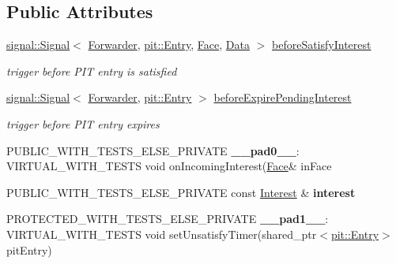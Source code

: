 \subsection*{Public Attributes}
\begin{DoxyCompactItemize}
\item 
\hyperlink{classndn_1_1util_1_1signal_1_1Signal}{signal\+::\+Signal}$<$ \hyperlink{classnfd_1_1Forwarder}{Forwarder}, \hyperlink{classnfd_1_1pit_1_1Entry}{pit\+::\+Entry}, \hyperlink{classnfd_1_1Face}{Face}, \hyperlink{classndn_1_1Data}{Data} $>$ \hyperlink{classnfd_1_1Forwarder_a32566fb05aa466ad3882221453ee28db}{before\+Satisfy\+Interest}
\begin{DoxyCompactList}\small\item\em trigger before P\+IT entry is satisfied \end{DoxyCompactList}\item 
\hyperlink{classndn_1_1util_1_1signal_1_1Signal}{signal\+::\+Signal}$<$ \hyperlink{classnfd_1_1Forwarder}{Forwarder}, \hyperlink{classnfd_1_1pit_1_1Entry}{pit\+::\+Entry} $>$ \hyperlink{classnfd_1_1Forwarder_a7e2f5b00f3146356077d84cd107a1394}{before\+Expire\+Pending\+Interest}
\begin{DoxyCompactList}\small\item\em trigger before P\+IT entry expires \end{DoxyCompactList}\item 
P\+U\+B\+L\+I\+C\+\_\+\+W\+I\+T\+H\+\_\+\+T\+E\+S\+T\+S\+\_\+\+E\+L\+S\+E\+\_\+\+P\+R\+I\+V\+A\+TE {\bfseries \+\_\+\+\_\+pad0\+\_\+\+\_\+}\+: V\+I\+R\+T\+U\+A\+L\+\_\+\+W\+I\+T\+H\+\_\+\+T\+E\+S\+TS void on\+Incoming\+Interest(\hyperlink{classnfd_1_1Face}{Face}\& in\+Face\hypertarget{classnfd_1_1Forwarder_a04f42f27280373151a8ecd74983089bf}{}\label{classnfd_1_1Forwarder_a04f42f27280373151a8ecd74983089bf}

\item 
P\+U\+B\+L\+I\+C\+\_\+\+W\+I\+T\+H\+\_\+\+T\+E\+S\+T\+S\+\_\+\+E\+L\+S\+E\+\_\+\+P\+R\+I\+V\+A\+TE const \hyperlink{classndn_1_1Interest}{Interest} \& {\bfseries interest}\hypertarget{classnfd_1_1Forwarder_a41e18f4d8424fff0fcbf75307047c277}{}\label{classnfd_1_1Forwarder_a41e18f4d8424fff0fcbf75307047c277}

\item 
P\+R\+O\+T\+E\+C\+T\+E\+D\+\_\+\+W\+I\+T\+H\+\_\+\+T\+E\+S\+T\+S\+\_\+\+E\+L\+S\+E\+\_\+\+P\+R\+I\+V\+A\+TE {\bfseries \+\_\+\+\_\+pad1\+\_\+\+\_\+}\+: V\+I\+R\+T\+U\+A\+L\+\_\+\+W\+I\+T\+H\+\_\+\+T\+E\+S\+TS void set\+Unsatisfy\+Timer(shared\+\_\+ptr$<$\hyperlink{classnfd_1_1pit_1_1Entry}{pit\+::\+Entry}$>$ pit\+Entry)\hypertarget{classnfd_1_1Forwarder_a177cc622f49c47cf9826e090ea86ecee}{}\label{classnfd_1_1Forwarder_a177cc622f49c47cf9826e090ea86ecee}

\end{DoxyCompactItemize}
